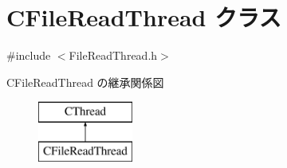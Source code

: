 \hypertarget{class_c_file_read_thread}{}\section{C\+File\+Read\+Thread クラス}
\label{class_c_file_read_thread}


{\ttfamily \#include $<$File\+Read\+Thread.\+h$>$}

C\+File\+Read\+Thread の継承関係図\begin{figure}[H]
\begin{center}
\leavevmode
\includegraphics[height=2.000000cm]{class_c_file_read_thread}
\end{center}
\end{figure}
